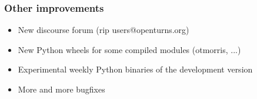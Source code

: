\documentclass{beamer}
\begin{document}
\begin{frame}
\frametitle{Other improvements}


\begin{itemize}
\item New discourse forum (rip users@openturns.org)
\item New Python wheels for some compiled modules (otmorris, ...)
\item Experimental weekly Python binaries of the development version
\item More and more bugfixes
\end{itemize}

% 

\end{frame}



% 
% 
% 
% 
% 

\end{document}
